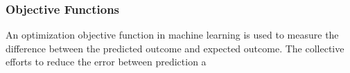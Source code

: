\subsubsection{Objective Functions}
An optimization objective function in machine learning is used to measure the difference between the predicted outcome and expected outcome. The collective efforts to reduce the error between prediction a